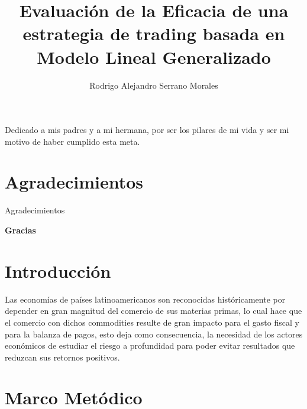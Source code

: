 \documentclass[a4paper,12pt]{Latex/Classes/PhDthesisPSnPDF}
\title{Evaluación de la Eficacia de una estrategia de trading basada en Modelo Lineal Generalizado}
\author{Rodrigo Alejandro Serrano Morales}
\begin{document}


\maketitle									%

\newpage\renewcommand{\thepage}{\arabic{page}}\setcounter{page}{1} 


\begin{dedication}
Dedicado a mis padres y a mi hermana, por ser los pilares de mi vida y ser mi motivo de haber cumplido esta meta.
\end{dedication}
\newpage
\chapter*{Agradecimientos}

Agradecimientos




  \begin{flushright}
  \textbf{Gracias}
  \end{flushright}

\tableofcontents
\listoffigures
\listoftables



\chapter*{Introducción}

Las economías de países latinoamericanos son reconocidas históricamente por depender en gran magnitud del comercio de sus materias primas, lo cual hace que el comercio con dichos commodities resulte de gran impacto para el gasto fiscal y para la balanza de pagos, esto deja como consecuencia, la necesidad de los actores económicos de estudiar el riesgo a profundidad para poder evitar resultados que reduzcan sus retornos positivos.\\ 


\chapter{Marco Metódico}
\end{document}
